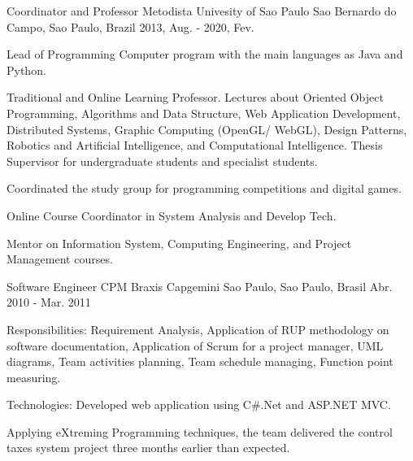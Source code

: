 \begin{cventries}
  \cventry
    {Coordinator and Professor} %
    {Metodista Univesity of Sao Paulo} %
    {Sao Bernardo do Campo, Sao Paulo, Brazil} %
    {2013, Aug. - 2020, Fev.} %
    {
          \begin{cvitems} %
            \item {Lead of Programming Computer program with the main languages as Java and Python.}
            \item {Traditional and Online Learning Professor. Lectures about Oriented Object Programming, Algorithms and Data Structure, Web Application Development, Distributed Systems, Graphic Computing (OpenGL/ WebGL), Design Patterns, Robotics and Artificial Intelligence, and Computational Intelligence. Thesis Supervisor for undergraduate students and specialist students.}
            \item {Coordinated the study group for programming competitions and digital games.}
            \item {Online Course Coordinator in System Analysis and Develop Tech.}
            \item {Mentor on Information System, Computing Engineering, and Project Management courses.}
          \end{cvitems}
    }

  \cventry
    {Software Engineer} %
    {CPM Braxis Capgemini} %
    {Sao Paulo, Sao Paulo, Brasil} %
    {Abr. 2010 - Mar. 2011} %
    {
          \begin{cvitems} %
            \item {Responsibilities: Requirement Analysis, Application of RUP methodology on software documentation, Application of Scrum for a project manager, UML diagrams, Team activities planning, Team schedule managing, Function point measuring.}
            \item {Technologies: Developed web application using C\#.Net and ASP.NET MVC.}
            \item {Applying eXtreming Programming techniques, the team delivered the control taxes system project three months earlier than expected.}
          \end{cvitems}
    }


\end{cventries}
